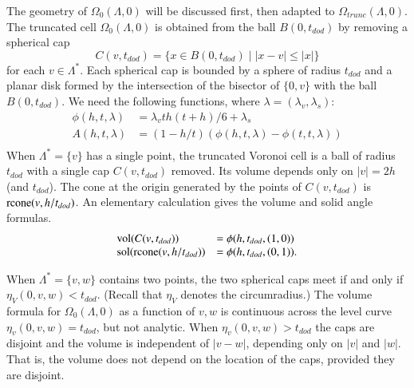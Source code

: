 The geometry of $\Omega_0(\Lambda,0)$ will be discussed first,
then adapted to $\Omega_{trunc}(\Lambda,0)$.  The truncated cell
$\Omega_0(\Lambda,0)$ is obtained from the ball $B(0,t_{dod})$ by
removing a spherical cap
   $$
   C(v,t_{dod}) = \{x \in B(0,t_{dod}) \mid  |x - v| \le |x| \}
   $$
for each $v\in\Lambda^*$.
Each spherical cap is bounded by a sphere of radius $t_{dod}$ and
a planar disk formed by the intersection of the bisector of 
$\{0,v\}$ with the ball $B(0,t_{dod})$.
We need the following functions, where $\lambda=(\lambda_v,\lambda_s)$:
\begin{equation}
\begin{array}{lll}
\phi(h,t,\lambda) &= \lambda_v t h (t+h)/6 + \lambda_s\\
A(h,t,\lambda) &= (1-h/t)(\phi(h,t,\lambda)-\phi(t,t,\lambda))\\
\end{array}
\end{equation}
When $\Lambda^* = \{v\}$ has a single point, the truncated Voronoi
cell is a ball of radius $t_{dod}$
with a single cap $C(v,t_{dod})$ removed.  Its volume depends
only on $|v|=2h$ (and $t_{dod}$).  
The cone at the origin generated by the points of $C(v,t_{dod})$ is
${\operatorname{rcone}}(v,h/t_{dod})$.  An elementary calculation gives the volume and
solid angle formulas.
\begin{equation}  
\begin{array}{lll}
{\operatorname{vol}}(C(v,t_{dod})) &= \phi(h,t_{dod},(1,0)) \\
{\operatorname{sol}}({\operatorname{rcone}}(v,h/t_{dod})) &= \phi(h,t_{dod},(0,1)).\\
\end{array}
\end{equation}



When $\Lambda^*=\{v,w\}$ contains two points, the two spherical
caps meet if and only if $\eta_V(0,v,w) < t_{dod}$.  (Recall that
$\eta_V$ denotes the circumradius.)   The volume formula for
$\Omega_0(\Lambda,0)$ as a function of $v,w$ is continuous
across the level curve $\eta_v(0,v,w)=t_{dod}$, but not analytic.
When $\eta_v(0,v,w) > t_{dod}$ the caps are disjoint and the
volume is independent of $|v-w|$, depending only on $|v|$ and $|w|$.
That is, the volume does not depend on the location of the caps,
provided they are disjoint.

